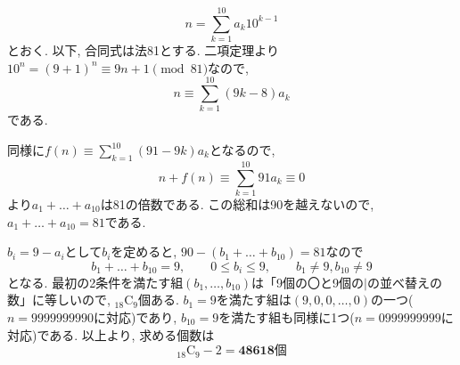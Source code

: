 \[n = \sum_{k=1}^{10} a_k 10^{k-1}\]
とおく. 以下, 合同式は法81とする. 二項定理より$10^n = (9 + 1)^n \equiv 9n + 1\pmod{81}$なので,
\[
n\equiv \sum_{k=1}^{10}(9k-8)a_k
\]
である.

同様に$f(n) \equiv \sum_{k=1}^{10} (91-9k)a_k$となるので,
\[
n + f(n) \equiv \sum_{k=1}^{10} 91 a_k \equiv 0
\]
より$a_1 + \dots + a_{10}$は81の倍数である. この総和は90を越えないので, $a_1 + \dots + a_{10} = 81$である.

$b_i = 9-a_i$として$b_i$を定めると, $90 - (b_1 + \dots + b_{10}) = 81$なので
\[
b_1 + \dots + b_{10} = 9,\qquad 0\leq b_i\leq 9,\qquad b_1\neq 9, b_{10}\neq 9
\]
となる. 最初の2条件を満たす組$(b_1,\dots, b_{10})$は「9個の〇と9個の$|$の並べ替えの数」に等しいので, ${}_{18}\mathrm{C}_{9}$個ある.
 $b_1 = 9$を満たす組は$(9,0,0,\dots, 0)$の一つ($n = 9999999990$に対応)であり,
 $b_{10} = 9$を満たす組も同様に1つ($n = 0999999999$に対応)である. 以上より, 求める個数は
\[
{}_{18}\mathrm{C}_{9} - 2 = \boldsymbol{48618}\text{個}
\]
